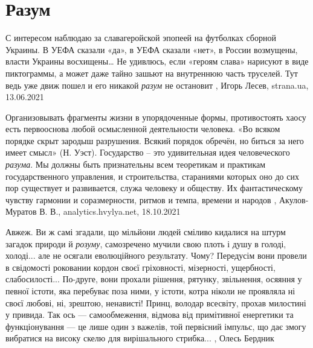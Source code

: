  
 
 
 
 
\chapter{Разум}
\label{sec:slova.razum}

С интересом наблюдаю за славагеройской эпопеей на футболках сборной Украины. В
УЕФА сказали «да», в УЕФА сказали «нет», в России возмущены, власти Украины
восхищены… Не удивлюсь, если «героям слава» нарисуют в виде пиктограммы, а
может даже тайно зашьют на внутреннюю часть труселей. Тут ведь уже движ пошел и
его никакой \emph{разум} не остановит
, 
Игорь Лесев, strana.ua, 13.06.2021

Организовывать фрагменты жизни в упорядоченные формы, противостоять хаосу есть
первооснова любой осмысленной деятельности человека. «Во всяком порядке скрыт
зародыш разрушения. Всякий порядок обречён, но биться за него имеет смысл» (Н.
Уэст).  Государство – это удивительная идея человеческого \emph{разума}. Мы должны
быть признательны всем теоретикам и практикам государственного управления, и
строительства, стараниями которых оно до сих пор существует и развивается,
служа человеку и обществу. Их фантастическому чувству гармонии и соразмерности,
ритмов и темпа, времени и народов
, 
Акулов-Муратов В. В., analytics.hvylya.net, 18.10.2021

Авжеж. Ви ж самі згадали, що мільйони людей сміливо кидалися на штурм загадок
природи й \emph{розуму}, самозречено мучили свою плоть і душу в голоді, холоді... але
не осягали еволюційного результату. Чому? Передусім вони провели в свідомості
роковании кордон своєї гріховності, мізерності, ущербності, слабосилості...
По-друге, вони прохали рішення, рятунку, звільнення, осяяння у певної істоти,
яка перебуває поза ними, у істоти, котра ніколи не проявляла ні своєї любові,
ні, зрештою, ненависті! Принц, володар всесвіту, прохав милостині у привида.
Так ось — самообмеження, відмова від примітивної енергетики та функціонування
— це лише один з важелів, той первісний імпульс, що дає змогу вибратися на
високу скелю для вирішального стрибка...
, Олесь Бердник
